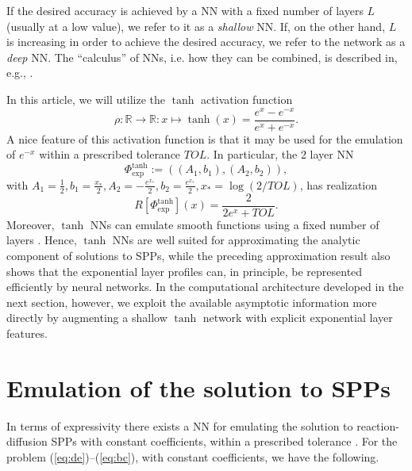 \documentclass[11pt]{article}
\providecommand{\R}{\ensuremath{\mathbb{R}}}
\theoremstyle{plain}
\theoremstyle{definition}
\theoremstyle{remark}
\numberwithin{equation}{section}
\begin{document}
If the desired accuracy is achieved by a NN with a fixed number of layers $L$  (usually at a low value), we refer to it as a \emph{shallow} NN. If, on the other hand, $L$ is increasing in order to achieve the desired accuracy, we refer to the network as a \emph{deep} NN.  The ``calculus'' of NNs, i.e. how they can be combined, is described in, e.g., \cite[Sec. 2]{OSX}. 

In this article, we will utilize the $\tanh$ activation function
$$
	\rho: \R \to \R: x \mapsto \tanh(x) = \frac{e^x - e^{-x}}{e^x + e^{-x}}.
$$
A nice feature of this activation function is that it may be used for the emulation of $e^{-x}$ within a
prescribed tolerance $TOL$. In particular, the 2 layer NN
%
$$
\Phi_{\exp}^{\tanh} := \left( (A_1, b_1) , (A_2, b_2)  \right),
$$
%
with $A_1 = \frac{1}{2}, b_1 = \frac{x_*}{2}, A_2 = -\frac{e^{x_*}}{2}, b_2 =\frac{e^{x_*}}{2}, x_* = \log(2/TOL)$, has realization
%
$$
R[\Phi_{\exp}^{\tanh}] (x) = \frac{2}{2e^x + TOL}.
$$
%
Moreover, $\tanh$ NNs can emulate smooth functions using a fixed number of layers \cite{Mishra}.
Hence, \(\tanh\) NNs are well suited for approximating the analytic component of solutions to SPPs, while the preceding approximation result also shows that the exponential layer profiles can, in principle, be represented efficiently by neural networks. In the computational architecture developed in the next section, however, we exploit the available asymptotic information more directly by augmenting a shallow \(\tanh\) network with explicit exponential layer features.

\section{Emulation of the solution to SPPs}
\label{sec:SBL2NN}
In terms of expressivity there exists a NN for emulating the solution to reaction-diffusion SPPs with constant coefficients, within a prescribed tolerance \cite[Theorem 14]{OSX}. For the problem (\ref{eq:de})--(\ref{eq:bc}), with constant coefficients, we have the following.
\end{document}
